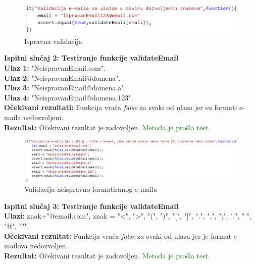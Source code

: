 {			%
				\begin{figure}[H]
					\centering
					\includegraphics[width=1\linewidth]{"slike/ispravnaValidacija.png"}
					\caption{Ispravna validacija}
					\label{fig:da-val}
				\end{figure}
			

			

			\noindent \textbf {Ispitni slučaj 2: Testiranje funkcije validateEmail}\\
			\noindent \textbf {Ulaz 1:} "NeispravanEmail.com".\\
			\noindent \textbf {Ulaz 2:} "NeispravanEmail@domena".\\
			\noindent \textbf {Ulaz 3:} "NeispravanEmail@domena.a".\\
			\noindent \textbf {Ulaz 4:} "NeispravanEmail@domena.123".\\
			\noindent \textbf {Očekivani rezultati:} Funkcija vraća \textit{false} za svaki od ulaza jer su formati e-maila nedozvoljeni.\\
			\noindent \textbf {Rezultat:} Očekivani rezultat je zadovoljen. \textcolor{green}{Metoda je prošla test.}\\
			
				\begin{figure}[H]
					\centering
					\includegraphics[width=1\linewidth]{"slike/neispravnaValidacija.png"}
					\caption{Validacija neispravno formatiranog e-maila}
					\label{fig:ne-val}
				\end{figure}
			
			\eject


			\noindent \textbf {Ispitni slučaj 3: Testiranje funkcije validateEmail}\\
			\noindent \textbf {Ulazi:} znak+"@email.com", znak = "<", ">", "(", ")", "[", "]", ".", ",", ";", ":", " ", "@", """.\\
			\noindent \textbf {Očekivani rezultat:} Funkcija vraća \textit{false} za svaki od ulaza jer je format e-mailova nedozvoljen.\\
			\noindent \textbf {Rezultat:} Očekivani rezultat je zadovoljen. \textcolor{green}{Metoda je prošla test.}\\

}
